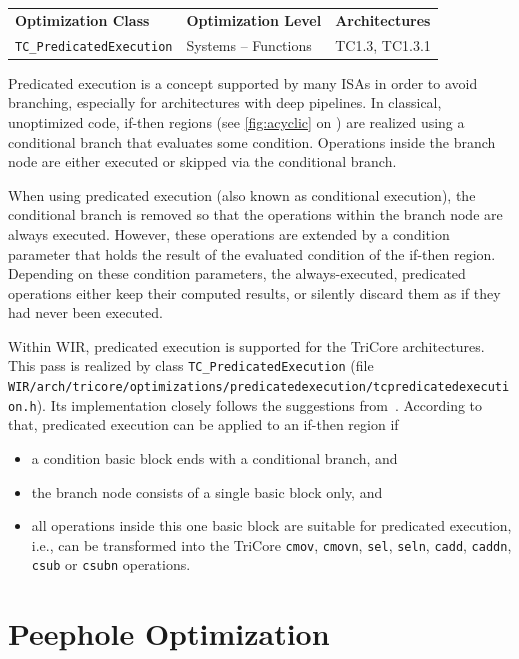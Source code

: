 \begin{tabular}{|l|l|l|}
  \hline
  \textbf{Optimization Class} & \textbf{Optimization Level} & \textbf{Architectures} \\
  \hhline{|=|=|=|}
  \texttt{TC\_PredicatedExecution} & Systems -- Functions & TC1.3, TC1.3.1 \\
  \hline
\end{tabular}

Predicated execution is a concept supported by many \glspl{ISA} in order to avoid branching, especially for architectures with deep pipelines.
In classical, unoptimized code, if-then regions (see \cref{fig:acyclic} on ) are realized using a conditional branch that evaluates some condition.
Operations inside the branch node are either executed or skipped via the conditional branch.

When using predicated execution (also known as conditional execution), the conditional branch is removed so that the operations within the branch node are always executed.
However, these operations are extended by a condition parameter that holds the result of the evaluated condition of the if-then region.
Depending on these condition parameters, the always-executed, predicated operations either keep their computed results, or silently discard them as if they had never been executed.

Within \gls{WIR}, predicated execution is supported for the TriCore architectures. This pass is realized by class \texttt{TC\_PredicatedExecution} (file \texttt{WIR/arch/tricore/optimizations/predicatedexecution/tcpredica\-tedexecution.h}).
Its implementation closely follows the suggestions from~\cite[sections~1.2.8 and 1.2.9]{tricore03a}.
According to that, predicated execution can be applied to an if-then region if
\begin{itemize}
  \item a condition basic block ends with a conditional branch, and
  \item the branch node consists of a single basic block only, and
  \item all operations inside this one basic block are suitable for predicated execution, i.e., can be transformed into the TriCore \texttt{cmov}, \texttt{cmovn}, \texttt{sel}, \texttt{seln}, \texttt{cadd}, \texttt{caddn}, \texttt{csub} or \texttt{csubn} operations.
\end{itemize}


\section{Peephole Optimization}
\label{sec:optpeep}

